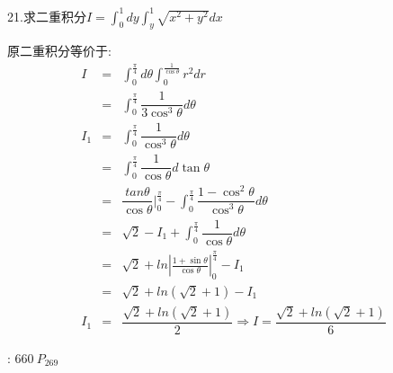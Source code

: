 21.求二重积分$I=\int_{0}^{1}dy\int_{y}^{1}\sqrt{x^2+y^2}dx$
\begin{solution}
	
	原二重积分等价于:  
	\begin{eqnarray*}
		I&=&\int_{0}^{\frac{\pi}{4}}d\theta\int_{0}^{\frac{1}{\cos \theta}}r^2dr\\
		&=&\int_{0}^{\frac{\pi}{4}}\dfrac{1}{3\cos^3\theta}d\theta\\
		I_{1}&=&\int_{0}^{\frac{\pi}{4}}\dfrac{1}{\cos^3\theta}d\theta\\
		&=&\int_{0}^{\frac{\pi}{4}}\dfrac{1}{\cos\theta}d\tan \theta\\
		&=&\dfrac{tan \theta}{\cos\theta}|_{0}^{\frac{\pi}{4}}-\int_{0}^{\frac{\pi}{4}}\dfrac{1-\cos^2\theta}{\cos^3\theta}d\theta\\
		&=&\sqrt{2}-I_{1}+\int_{0}^{\frac{\pi}{4}}\dfrac{1}{\cos \theta}d\theta\\
		&=&\sqrt{2}+ln|\frac{1+\sin\theta}{\cos\theta}|_{0}^{\frac{\pi}{4}}-I_{1}\\
		&=&\sqrt{2}+ln(\sqrt{2}+1)-I_{1}\\
	I_{1}&=&\dfrac{\sqrt{2}+ln(\sqrt{2}+1)}{2}\Rightarrow I=\dfrac{\sqrt{2}+ln(\sqrt{2}+1)}{6}
	\end{eqnarray*}
\end{solution}
\begin{anymark}[注]
	[题目来源]:  $660 \ P_{269}$
\end{anymark}

